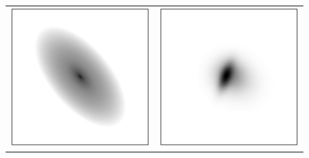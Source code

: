 \documentclass[12pt,pdftex,preprint]{aastex}
\newlength{\figurewidth}
\begin{document}
\begin{figure}
\begin{tabular}{@{}c@{}c@{}}
\includegraphics[width=\figurewidth]{trdemo-03.pdf} &
\includegraphics[width=\figurewidth]{trdemo-06.pdf} \\

\end{tabular}
\end{figure}
\end{document}
